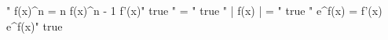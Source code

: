 " f(x)^n = n f(x)^{n - 1} f'(x)" true
"  = " true
" \ln | f(x) | = " true
" e^{f(x)} = f'(x) e^{f(x)}" true
